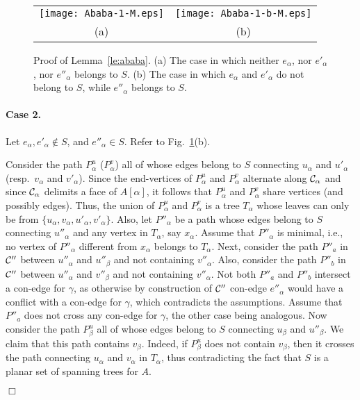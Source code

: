 \documentclass[letter,runningheads]{llncs}
\renewenvironment{proof}
{{\em Proof.\ }}{\hspace*{\fill}$\Box$\par\vspace{2mm}}
\begin{document}
\begin{proof}
\begin{figure}[tb]
\begin{center}
\begin{tabular}{c c}
\mbox{\texttt{[image: Ababa-1-M.eps]}} \hspace{1mm} &
\mbox{\texttt{[image: Ababa-1-b-M.eps]}}\\
(a) \hspace{1mm} & (b)
\end{tabular}
\caption{Proof of Lemma~\ref{le:ababa}. (a) The case in which neither $e_{\alpha}$, nor $e'_{\alpha}$, nor $e''_{\alpha}$ belongs to $S$. (b) The case in which $e_{\alpha}$ and $e'_{\alpha}$ do not belong to $S$, while $e''_{\alpha}$ belongs to $S$.}
\label{fig:ababa}
\end{center}
\end{figure}

\paragraph{Case 2.} Let $e_{\alpha},e'_{\alpha}\notin S$, and $e''_{\alpha}\in S$. Refer to Fig.~\ref{fig:ababa}(b).

Consider the path $P^u_{\alpha}$ ($P^v_{\alpha}$) all of whose edges belong to $S$ connecting $u_{\alpha}$ and $u'_{\alpha}$ (resp.\ $v_{\alpha}$ and $v'_{\alpha}$). Since the end-vertices of $P^u_{\alpha}$ and $P^v_{\alpha}$ alternate along ${\cal C}_{\alpha}$ and since ${\cal C}_{\alpha}$ delimits a face of $A[\alpha]$, it follows that $P^u_{\alpha}$ and $P^v_{\alpha}$ share vertices (and possibly edges). Thus, the union of $P^u_{\alpha}$ and $P^v_{\alpha}$ is a tree $T_{\alpha}$ whose leaves can only be from $\{u_{\alpha},v_{\alpha},u'_{\alpha},v'_{\alpha}\}$. Also, let $P''_{\alpha}$ be a path whose edges belong to $S$ connecting $u''_{\alpha}$ and any vertex in $T_{\alpha}$, say $x_\alpha$. Assume that $P''_{\alpha}$ is minimal, i.e., no vertex of $P''_{\alpha}$ different from $x_\alpha$ belongs to $T_{\alpha}$.
Next, consider the path $P''_a$ in ${\cal C}''$ between $u''_{\alpha}$ and $u''_{\beta}$ and not containing $v''_{\alpha}$. Also, consider the path $P''_b$ in ${\cal C}''$ between $u''_{\alpha}$ and $v''_{\beta}$ and not containing $v''_{\alpha}$. Not both $P''_a$ and $P''_b$ intersect a con-edge for $\gamma$, as otherwise by construction of ${\cal C}''$ con-edge $e''_{\alpha}$ would have a conflict with a con-edge for $\gamma$, which contradicts the assumptions. Assume that $P''_a$ does not cross any con-edge for $\gamma$, the other case being analogous.
Now consider the path $P^u_{\beta}$ all of whose edges belong to $S$ connecting $u_{\beta}$ and $u''_{\beta}$. We claim that this path contains $v_{\beta}$. Indeed, if $P^u_{\beta}$ does not contain $v_{\beta}$, then it crosses the path connecting $u_{\alpha}$ and $v_{\alpha}$ in $T_{\alpha}$, thus contradicting the fact that $S$ is a planar set of spanning trees for $A$.


\end{proof}
\end{document}
